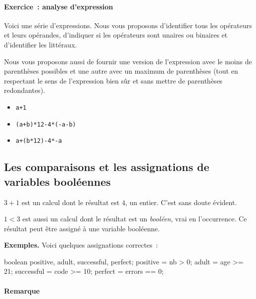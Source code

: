 			\begin{Emphase}
				\paragraph{Exercice~: analyse d’expression}
				
				Voici une série d’expressions. Nous vous proposons d’identifier
				tous les opérateurs et leurs opérandes, d’indiquer si les
				opérateurs sont unaires ou binaires et d’identifier les
				littéraux.  
				
				Nous vous proposons aussi de fournir une version de
				l’expression avec le moins de parenthèses possibles et une autre
				avec un maximum de parenthèses (tout en respectant le sens de
				l’expression bien sûr et sans mettre de parenthèses redondantes).
				
				\begin{itemize}
				\item \Verb_a+1_
				\item \Verb_(a+b)*12-4*(-a-b)_ 
				\item \Verb_a+(b*12)-4*-a_ 
				\end{itemize}
			\end{Emphase}
		

		\subsection{Les comparaisons et les assignations de variables booléennes}
		
			$3+1$ est un calcul dont le résultat est $4$, un entier. C'est sans
			doute évident.
			
			$1<3$ est aussi un calcul dont le résultat est un \emph{booléen},
			vrai en l’occurrence.  Ce résultat peut être assigné à une variable
			booléenne.			

			\textbf{Exemples.}
			Voici quelques assignations correctes~:
			
			\begin{java}
boolean positive, 
	adult, 
	successful, 
	perfect;
positive = nb > 0;
adult = age >= 21;
successful = code >= 10;
perfect = errors == 0;
			\end{java}

			\paragraph{Remarque}

